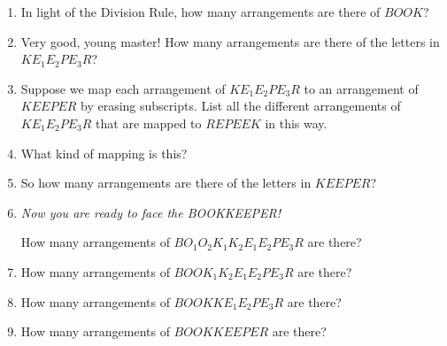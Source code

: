 \documentclass[12pt]{article}
\begin{document}
\begin{enumerate}

\item In light of the Division Rule, how many arrangements are there
of $BOOK$?


\item Very good, young master!  How many arrangements are there of
the letters in $KE_1E_2PE_3R$?


\item Suppose we map each arrangement of $KE_1E_2PE_3R$ to an
arrangement of $KEEPER$ by erasing subscripts.  List all the different
arrangements of $KE_1E_2PE_3R$ that are mapped to $REPEEK$ in this way.


\item What kind of mapping is this?


\item So how many arrangements are there of the letters in $KEEPER$?


\item {\em Now you are ready to face the BOOKKEEPER!}

How many arrangements of $BO_1O_2K_1K_2E_1E_2PE_3R$ are there?


\item How many arrangements of $BOOK_1K_2E_1E_2PE_3R$ are there?


\item How many arrangements of $BOOKKE_1E_2PE_3R$ are there?


\item How many arrangements of $BOOKKEEPER$ are there?


\end{enumerate}
\end{document}
